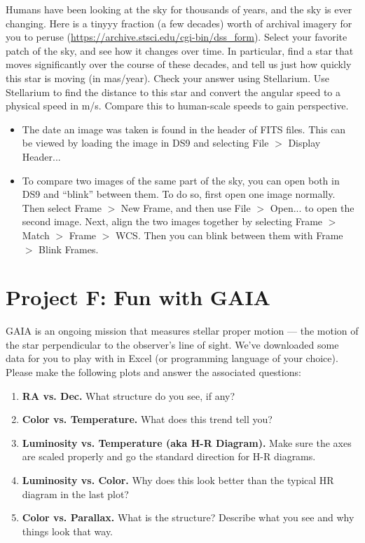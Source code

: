 Humans have been looking at the sky for thousands of years, and the sky is ever changing. Here is a tinyyy fraction (a few decades) worth of archival imagery for you to peruse (\url{https://archive.stsci.edu/cgi-bin/dss_form}). Select your favorite patch of the sky, and see how it changes over time. In particular, find a star that moves significantly over the course of these decades, and tell us just how quickly this star is moving (in mas/year). Check your answer using Stellarium. Use Stellarium to find the distance to this star and convert the angular speed to a physical speed in m/s. Compare this to human-scale speeds to gain perspective.

\begin{itemize}
	\item The date an image was taken is found in the header of FITS files. This can be viewed by loading the image in DS9 and selecting File $>$ Display Header...
	
	\item To compare two images of the same part of the sky, you can open both in DS9 and ``blink'' between them. To do so, first open one image normally. Then select Frame $>$ New Frame, and then use File $>$ Open... to open the second image. Next, align the two images together by selecting Frame $>$ Match $>$ Frame $>$ WCS. Then you can blink between them with Frame $>$ Blink Frames.
\end{itemize}

\section{Project F: Fun with GAIA}

GAIA is an ongoing mission that measures stellar proper motion --- the motion of the star perpendicular to the observer’s line of sight. We’ve downloaded some data for you to play with in Excel (or programming language of your choice). Please make the following plots and answer the associated questions:

\begin{enumerate}
	\item \textbf{RA vs. Dec.} What structure do you see, if any?
	
	\item \textbf{Color vs. Temperature.} What does this trend tell you?
	
	\item \textbf{Luminosity vs. Temperature (aka H-R Diagram).} Make sure the axes are scaled properly and go the standard direction for H-R diagrams.
	
	\item \textbf{Luminosity vs. Color.} Why does this look better than the typical HR diagram in the last plot?
	
	\item \textbf{Color vs. Parallax.} What is the structure? Describe what you see and why things look that way.
\end{enumerate}

